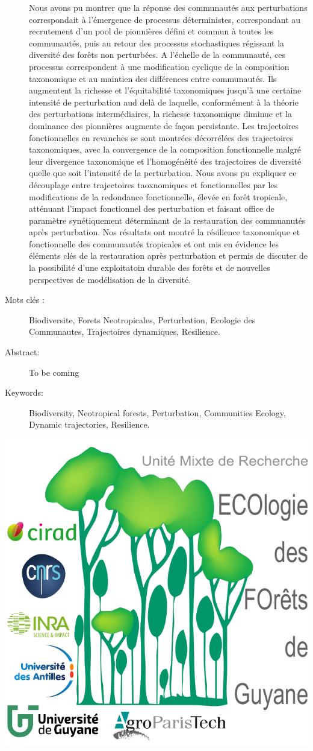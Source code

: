 \documentclass[
  11pt,
  french,
  A4paper,
  extrafontsizes,onecolumn,openright
  ]{memoir}
\begin{document}
\begin{normalsize}
\begin{description}
Nous avons pu montrer que la réponse des communautés aux perturbations
correspondait à l'émergence de processus déterministes, correspondant au
recrutement d'un pool de pionnières défini et commun à toutes les
communautés, puis au retour des processus stochastiques régissant la
diversité des forêts non perturbées. A l'échelle de la communauté, ces
processus correspondent à une modification cyclique de la composition
taxonomique et au maintien des différences entre communautés. Ils
augmentent la richesse et l'équitabilité taxonomiques jusqu'à une
certaine intensité de perturbation aud delà de laquelle, conformément à
la théorie des perturbations intermédiaires, la richesse taxonomique
diminue et la dominance des pionnières augmente de façon persistante.
Les trajectoires fonctionnelles en revanches se sont montrées
décorrélées des trajectoires taxonomiques, avec la convergence de la
composition fonctionnelle malgré leur divergence taxonomique et
l'homogénéité des trajectoires de diversité quelle que soit l'intensité
de la perturbation. Nous avons pu expliquer ce découplage entre
trajectoires taoxnomiques et fonctionnelles par les modifications de la
redondance fonctionnelle, élevée en forêt tropicale, atténuant l'impact
fonctionnel des perturbation et faisant office de paramètre
synétiquement déterminant de la restauration des commuanutés après
perturbation. Nos résultats ont montré la résilience taxonomique et
fonctionnelle des communautés tropicales et ont mis en évidence les
éléments clés de la restauration après perturbation et permis de
discuter de la possibilité d'une exploitatoin durable des forêts et de
nouvelles perspectives de modélisation de la diversité.

\item[Mots clés :]
Biodiversite, Forets Neotropicales, Perturbation, Ecologie des Communautes, Trajectoires dynamiques, Resilience.
~\\

\item[Abstract:]
To be coming

\item[Keywords:]
Biodiversity, Neotropical forests, Perturbation, Communities Ecology, Dynamic trajectories, Resilience.

\end{description}

\end{normalsize}

\vspace*{\fill}
\centering\includegraphics[width=.3\textwidth]{images/Logo-Lab}
\end{document}
